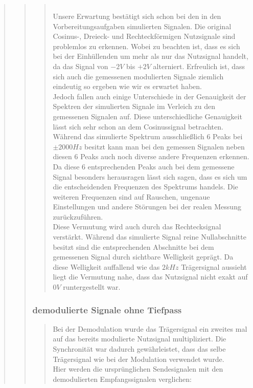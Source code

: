 \begin{quote}
\begin{quote}
\begin{quote}
\begin{center}
\begin{tabular}{ll}
                \end{tabular}
                \end{center}
                
                Unsere Erwartung bestätigt sich schon bei den in den Vorbereitungsaufgaben simulierten Signalen. Die
                original Cosinus-, Dreieck- und Rechteckförmigen Nutzsignale sind problemlos zu erkennen. Wobei zu
                beachten ist, dass es sich bei der Einhüllenden um mehr als nur das Nutzsignal handelt, da das Signal
                von $-2V$ bis $+2V$ alterniert. Erfreulich ist, dass sich auch die gemessenen modulierten Signale
                ziemlich eindeutig so ergeben wie wir es erwartet haben.\\
                Jedoch fallen auch einige Unterschiede in der Genauigkeit der Spektren der simulierten Signale im
                Verleich zu den gemessenen Signalen auf. Diese unterschiedliche Genauigkeit lässt sich sehr schon an dem
                Cosinussignal betrachten. Während das simulierte Spektrum ausschließlich $6$ Peaks bei $\pm 2000 Hz$
                besitzt kann man bei den gemessen Signalen neben diesen $6$ Peaks auch noch diverse andere Frequenzen
                erkennen. Da diese $6$ entsprechenden Peaks auch bei dem gemessene Signal besonders herausragen lässt
                sich sagen, dass es sich um die entscheidenden Frequenzen des Spektrums handels. Die weiteren Frequenzen
                sind auf Rauschen, ungenaue Einstellungen und andere Störungen bei der realen Messung zurückzuführen.\\
                Diese Vermutung wird auch durch das Rechtecksignal verstärkt. Während das simulierte Signal reine
                Nullabschnitte besitzt sind die entsprechenden Abschnitte bei dem gemessenen Signal durch sichtbare
                Welligkeit geprägt. Da diese Welligkeit auffallend wie das $2kHz$ Trägersignal aussieht liegt die
                Vermutung nahe, dass das Nutzsignal nicht exakt auf $0V$ runtergestellt war.
                  
                
			
		\end{quote}
            
        \subsubsection{demodulierte Signale ohne Tiefpass}
		\begin{quote}
            Bei der Demodulation wurde das Trägersignal ein zweites mal auf das
            bereits modulierte Nutzsignal multipliziert. Die Synchronität war
            dadurch gewährleistet, dass das selbe Trägersignal wie bei der
            Modulation verwendet wurde.\\
            Hier werden die ursprünglichen Sendesignalen mit den
            demodulierten Empfangssignalen verglichen:
            

\end{quote}
\end{quote}
\end{quote}
